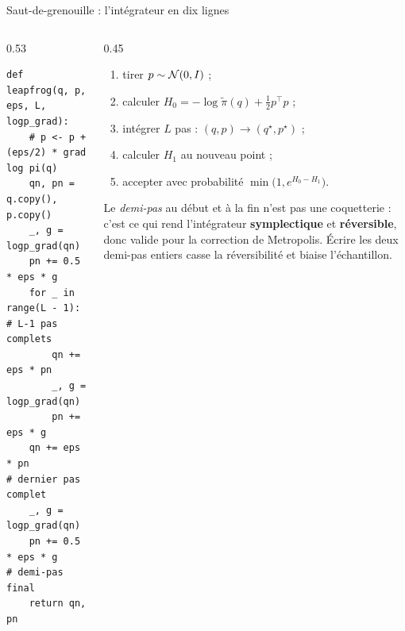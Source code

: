 \begin{frame}[fragile]{Saut-de-grenouille : l'intégrateur en dix lignes}
\footnotesize
\begin{columns}[t]
\begin{column}{0.53\textwidth}
\begin{codebox}
\begin{lstlisting}
def leapfrog(q, p, eps, L, logp_grad):
    # p <- p + (eps/2) * grad log pi(q)
    qn, pn = q.copy(), p.copy()
    _, g = logp_grad(qn)
    pn += 0.5 * eps * g
    for _ in range(L - 1):        # L-1 pas complets
        qn += eps * pn
        _, g = logp_grad(qn)
        pn += eps * g
    qn += eps * pn                # dernier pas complet
    _, g = logp_grad(qn)
    pn += 0.5 * eps * g           # demi-pas final
    return qn, pn
\end{lstlisting}
\end{codebox}
\end{column}
\begin{column}{0.45\textwidth}
\begin{ebox}
\begin{enumerate}
  \item tirer $p \sim \mathcal{N}(0, I)$ ;
  \item calculer $H_0 = -\log\tilde\pi(q) + \tfrac12 p^{\!\top}p$ ;
  \item intégrer $L$ pas : $(q,p) \to (q^\star, p^\star)$ ;
  \item calculer $H_1$ au nouveau point ;
  \item accepter avec probabilité $\min\!\big(1, e^{H_0 - H_1}\big)$.
\end{enumerate}
\end{ebox}
\begin{kbox}
\small
Le \emph{demi-pas} au début et à la fin n'est pas une coquetterie : c'est ce qui
rend l'intégrateur \textbf{symplectique} et \textbf{réversible}, donc valide pour
la correction de Metropolis. Écrire les deux demi-pas entiers casse la
réversibilité et biaise l'échantillon.
\end{kbox}
\end{column}
\end{columns}
\end{frame}

